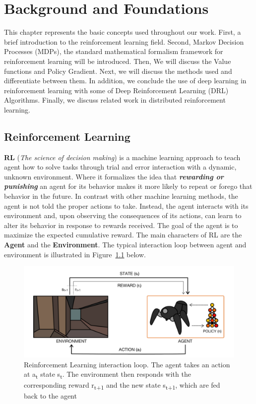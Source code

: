 
\chapter{Background and Foundations}\label{chapter:background_and_foundations}

This chapter represents the basic concepts used throughout our work. First, a brief introduction to the reinforcement learning field. Second, Markov Decision Processes (MDPs), the standard mathematical formalism framework for reinforcement learning will be introduced. Then, We will discuss the Value functions and Policy Gradient. Next, we will discuss the methods used and differentiate between them. In addition, we conclude the use of deep learning in reinforcement learning with some of Deep Reinforcement Learning (DRL) Algorithms. Finally, we discuss related work in distributed reinforcement learning.

\section{Reinforcement Learning}

\textbf{RL} (\textit{The science of decision making}) is a machine learning approach to teach agent how to solve tasks through trial and error interaction with a dynamic, unknown environment. Where it formalizes the idea that \textit{\textbf{rewarding or punishing}} an agent for its behavior makes it more likely to repeat or forego that behavior in the future. In contrast with other machine learning methods, the agent is not told the proper actions to take. Instead, the agent interacts with its environment and, upon observing the consequences of its actions, can learn to alter its behavior in response to rewards received. The goal of the agent is to maximize the expected cumulative reward. The main characters of RL are the \textbf{Agent} and the \textbf{Environment}. The typical interaction loop between agent and environment is illustrated in Figure~\ref{fig:agent_env} below.

\begin{figure}[!htb]
	\centering
	\includegraphics[width=.5\linewidth]{figures/Agent-Env.png}
	\caption{Reinforcement Learning interaction loop. The agent takes an action at a\textsubscript{t} state s\textsubscript{t}. The environment then responds with the corresponding reward r\textsubscript{t+1} and the new state s\textsubscript{t+1}, which are fed back to the agent~\parencite{arulkumaran2017brief}}
	\label{fig:agent_env}
\end{figure}

